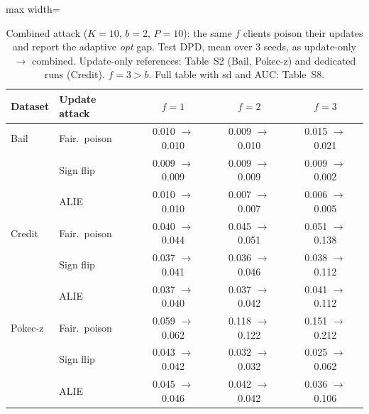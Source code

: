 \begin{table}[tbp]
\centering
\footnotesize
\setlength{\tabcolsep}{4pt}
\caption{Combined attack ($K=10$, $b=2$, $P=10$): the same $f$ clients poison their updates and report the adaptive \emph{opt} gap. Test DPD, mean over 3 seeds, as update-only $\to$ combined. Update-only references: Table~S2 (Bail, Pokec-z) and dedicated runs (Credit). $f=3>b$. Full table with sd and AUC: Table~S8.}
\label{tab:e9}
\begin{adjustbox}{max width=\textwidth}
\begin{tabular}{llccc}
\toprule
Dataset & Update attack & $f=1$ & $f=2$ & $f=3$ \\
\midrule
Bail & Fair.\ poison & 0.010 $\to$ 0.010 & 0.009 $\to$ 0.010 & 0.015 $\to$ 0.021 \\
 & Sign flip & 0.009 $\to$ 0.009 & 0.009 $\to$ 0.009 & 0.009 $\to$ 0.002 \\
 & ALIE & 0.010 $\to$ 0.010 & 0.007 $\to$ 0.007 & 0.006 $\to$ 0.005 \\
\midrule
Credit & Fair.\ poison & 0.040 $\to$ 0.044 & 0.045 $\to$ 0.051 & 0.051 $\to$ 0.138 \\
 & Sign flip & 0.037 $\to$ 0.041 & 0.036 $\to$ 0.046 & 0.038 $\to$ 0.112 \\
 & ALIE & 0.037 $\to$ 0.040 & 0.037 $\to$ 0.042 & 0.041 $\to$ 0.112 \\
\midrule
Pokec-z & Fair.\ poison & 0.059 $\to$ 0.062 & 0.118 $\to$ 0.122 & 0.151 $\to$ 0.212 \\
 & Sign flip & 0.043 $\to$ 0.042 & 0.032 $\to$ 0.032 & 0.025 $\to$ 0.062 \\
 & ALIE & 0.045 $\to$ 0.046 & 0.042 $\to$ 0.042 & 0.036 $\to$ 0.106 \\
\bottomrule
\end{tabular}
\end{adjustbox}
\end{table}
